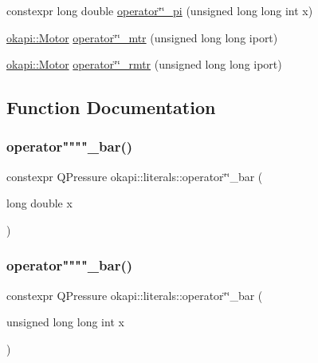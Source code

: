\begin{DoxyCompactItemize}
\item 
constexpr long double \mbox{\hyperlink{namespaceokapi_1_1literals_a32a563b32efa7e39480f90e5b9db8e6a}{operator\char`\"{}\char`\"{}\+\_\+pi}} (unsigned long long int x)
\item 
\mbox{\hyperlink{classokapi_1_1Motor}{okapi\+::\+Motor}} \mbox{\hyperlink{namespaceokapi_1_1literals_afb36c0a052d071526199c356a6bbcf50}{operator\char`\"{}\char`\"{}\+\_\+mtr}} (unsigned long long iport)
\item 
\mbox{\hyperlink{classokapi_1_1Motor}{okapi\+::\+Motor}} \mbox{\hyperlink{namespaceokapi_1_1literals_a396af6caf649c912001004f9155c1c2c}{operator\char`\"{}\char`\"{}\+\_\+rmtr}} (unsigned long long iport)
\end{DoxyCompactItemize}


\subsection{Function Documentation}
\mbox{\label{namespaceokapi_1_1literals_a0c2d73023291966566c98c439789d640}} 
\subsubsection{\texorpdfstring{operator""""\_bar()}{operator""\_bar()}\hspace{0.1cm}{\footnotesize\ttfamily [1/2]}}
{\footnotesize\ttfamily constexpr Q\+Pressure okapi\+::literals\+::operator\char`\"{}\char`\"{}\+\_\+bar (\begin{DoxyParamCaption}\item[{long double}]{x }\end{DoxyParamCaption})}

\mbox{\label{namespaceokapi_1_1literals_aa470b7c898aa5dce28e67d3b095ee683}} 
\subsubsection{\texorpdfstring{operator""""\_bar()}{operator""\_bar()}\hspace{0.1cm}{\footnotesize\ttfamily [2/2]}}
{\footnotesize\ttfamily constexpr Q\+Pressure okapi\+::literals\+::operator\char`\"{}\char`\"{}\+\_\+bar (\begin{DoxyParamCaption}\item[{unsigned long long int}]{x }\end{DoxyParamCaption})}


